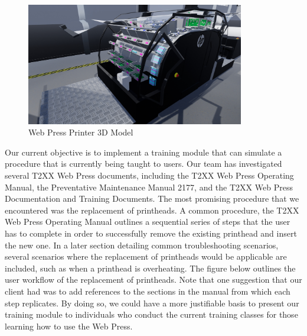 \documentclass[onecolumn, draftclsnofoot,10pt, compsoc]{IEEEtran}
\begin{document}
\begin{figure}[ht!]
    \centering
    \includegraphics[width=0.85\textwidth]{press1.png}
    \caption{Web Press Printer 3D Model}
    \label{fig:printerModel}
\end{figure}

Our current objective is to implement a training module that can simulate a procedure that is currently being taught to users. Our team has investigated several T2XX Web Press documents, including the T2XX Web Press Operating Manual, the Preventative Maintenance Manual 2177, and the T2XX Web Press Documentation and Training Documents. The most promising procedure that we encountered was the replacement of printheads. A common procedure, the T2XX Web Press Operating Manual outlines a sequential series of steps that the user has to complete in order to successfully remove the existing printhead and insert the new one. In a later section detailing common troubleshooting scenarios, several scenarios where the replacement of printheads would be applicable are included, such as when a printhead is overheating. The figure below outlines the user workflow of the replacement of printheads. Note that one suggestion that our client had was to add references to the sections in the manual from which each step replicates. By doing so, we could have a more justifiable basis to present our training module to individuals who conduct the current training classes for those learning how to use the Web Press.
\end{document}
